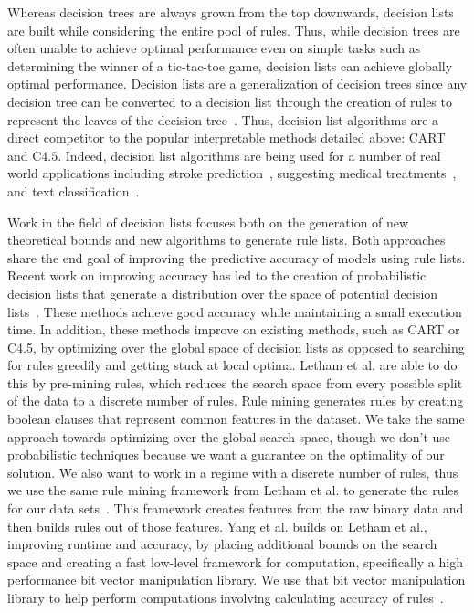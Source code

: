Whereas decision trees are always grown from the top downwards, decision lists are built while considering the entire pool of rules.
Thus, while decision trees are often unable to achieve optimal performance even on simple tasks such as determining the winner of a tic-tac-toe game, decision lists can achieve globally optimal performance.
Decision lists are a generalization of decision trees since any decision tree can be converted to a decision list through the creation of rules to represent the leaves of the decision tree~\cite{Rivest87}.
Thus, decision list algorithms are a direct competitor to the popular interpretable methods detailed above: CART and C$4.5$.
Indeed, decision list algorithms are being used for a number of real world applications including stroke prediction~\cite{LethamRuMcMa15}, suggesting medical treatments~\cite{ZhangLaTsDa2015}, and text classification~\cite{LiYa02}.

Work in the field of decision lists focuses both on the generation of new theoretical bounds and new algorithms to generate rule lists.
Both approaches share the end goal of improving the predictive accuracy of models using rule lists.
Recent work on improving accuracy has led to the creation of probabilistic decision lists that generate a distribution over the space of potential decision lists~\cite{LethamRuMcMa15,YangRuSe16}.
These methods achieve good accuracy while maintaining a small execution time.
In addition, these methods improve on existing methods, such as CART or C4.5, by optimizing over the global space of decision lists as opposed to searching for rules greedily and getting stuck at local optima.
Letham et al. are able to do this by pre-mining rules, which reduces the search space from every possible split of the data to a discrete number of rules.
Rule mining generates rules by creating boolean clauses that represent common features in the dataset.
We take the same approach towards optimizing over the global search space, though we don’t use probabilistic techniques because we want a guarantee on the optimality of our solution.
We also want to work in a regime with a discrete number of rules, thus we use the same rule mining framework from Letham et al. to generate the rules for our data sets~\cite{LethamRuMcMa15}.
This framework creates features from the raw binary data and then builds rules out of those features.
Yang et al. builds on Letham et al., improving runtime and accuracy, by placing additional bounds on the search space and creating a fast low-level framework for computation, specifically a high performance bit vector manipulation library.
We use that bit vector manipulation library to help perform computations involving calculating accuracy of rules~\cite{YangRuSe16}.

